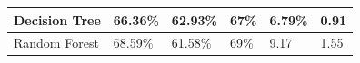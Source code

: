 \begin{table}[]
\begin{tabular}{|l|l|l|l|l|l|}
		\textbf{Decision Tree}                                                                        & 66.36\%           & 62.93\%                                                           & 67\%                                                                 & \textbf{6.79\%}      & \textbf{0.91}     \\ \hline
		Random Forest                                                                        		  & 68.59\%           & 61.58\%                                                           & 69\%                                                                 & 9.17\      & 1.55     \\ \hline
	\end{tabular}
\end{table}
